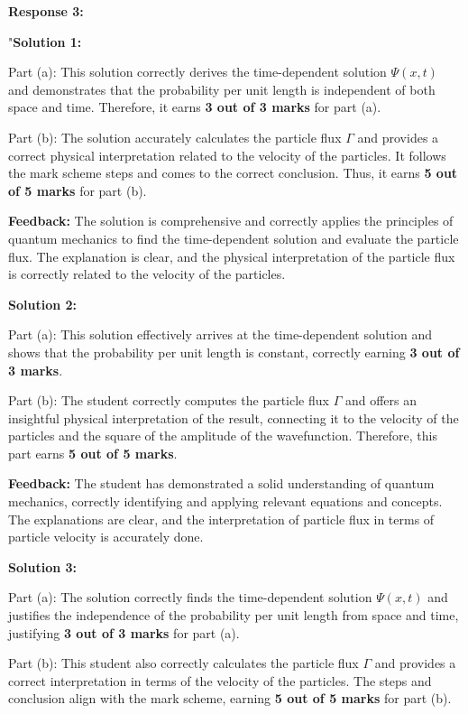 \documentclass[a4paper,11pt]{article}
\begin{document}
\textbf{Response 3:}

"\textbf{Solution 1:}

Part (a): This solution correctly derives the time-dependent solution \( \Psi(x,t) \) and demonstrates that the probability per unit length is independent of both space and time. Therefore, it earns \textbf{3 out of 3 marks} for part (a).

Part (b): The solution accurately calculates the particle flux \( \Gamma \) and provides a correct physical interpretation related to the velocity of the particles. It follows the mark scheme steps and comes to the correct conclusion. Thus, it earns \textbf{5 out of 5 marks} for part (b).

\textbf{Feedback:} The solution is comprehensive and correctly applies the principles of quantum mechanics to find the time-dependent solution and evaluate the particle flux. The explanation is clear, and the physical interpretation of the particle flux is correctly related to the velocity of the particles.

\hrulefill

\textbf{Solution 2:}

Part (a): This solution effectively arrives at the time-dependent solution and shows that the probability per unit length is constant, correctly earning \textbf{3 out of 3 marks}.

Part (b): The student correctly computes the particle flux \( \Gamma \) and offers an insightful physical interpretation of the result, connecting it to the velocity of the particles and the square of the amplitude of the wavefunction. Therefore, this part earns \textbf{5 out of 5 marks}.

\textbf{Feedback:} The student has demonstrated a solid understanding of quantum mechanics, correctly identifying and applying relevant equations and concepts. The explanations are clear, and the interpretation of particle flux in terms of particle velocity is accurately done.

\hrulefill

\textbf{Solution 3:}

Part (a): The solution correctly finds the time-dependent solution \( \Psi(x,t) \) and justifies the independence of the probability per unit length from space and time, justifying \textbf{3 out of 3 marks} for part (a).

Part (b): This student also correctly calculates the particle flux \( \Gamma \) and provides a correct interpretation in terms of the velocity of the particles. The steps and conclusion align with the mark scheme, earning \textbf{5 out of 5 marks} for part (b).
\end{document}
